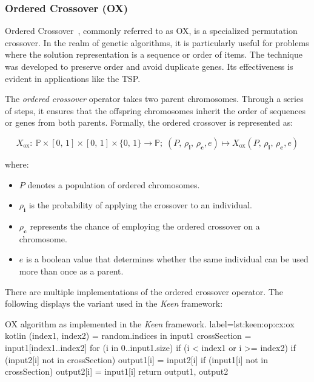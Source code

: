 \subsubsection{Ordered Crossover (OX)}
\label{sec:keen:op:cx:ox}

  Ordered Crossover~\autocite{bergelAgileArtificialIntelligence2020}, commonly 
  referred to as OX, is a specialized permutation crossover. In the realm of 
  genetic algorithms, it is particularly useful for problems where the solution 
  representation is a sequence or order of items. The technique was developed 
  to preserve order and avoid duplicate genes. Its effectiveness is evident in 
  applications like the TSP.

  \begin{definition}
    The \textit{ordered crossover} operator takes two parent chromosomes. 
    Through a series of steps, it ensures that the offspring chromosomes 
    inherit the order of sequences or genes from both parents. Formally, the 
    ordered crossover is represented as:

    \begin{equation}
        X_\mathrm{ox} :\: 
            \mathbb{P} \times [0,\, 1] \times [0,\, 1] \times \{0,\, 1\} \rightarrow \mathbb{P};\;
            (P,\, \rho_\textbf{i},\, \rho_\mathbf{c}, e)
              \mapsto X_\mathrm{ox}(P,\, \rho_\textbf{i},\, \rho_\mathbf{c}, e)
    \end{equation}

    where:

    \begin{itemize}
      \item \(P\) denotes a population of ordered chromosomes.
      \item \(\rho_\textbf{i}\) is the probability of applying the crossover to an individual.
      \item \(\rho_\mathbf{c}\) represents the chance of employing the ordered crossover on a chromosome.
      \item \(e\) is a boolean value that determines whether the same individual can be used more than once as a parent.
    \end{itemize}
  \end{definition}

  There are multiple implementations of the ordered crossover operator. The 
  following displays the variant used in the \textit{Keen} framework:

  \begin{code}{
      OX algorithm as implemented in the \textit{Keen} framework.
  }{
      label={lst:keen:op:cx:ox}
  }{kotlin}
      (index1, index2) = random.indices in input1
      crossSection = input1[index1..index2]
      for (i in 0..input1.size) {
          if (i < index1 or i >= index2) {
              if (input2[i] not in crossSection) {
                  output1[i] = input2[i]
              }
              if (input1[i] not in crossSection) {
                  output2[i] = input1[i]
              }
          }
      }
      return output1, output2
  \end{code}

